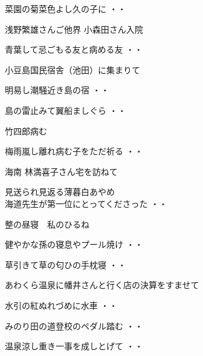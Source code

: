 \begin{shiika}菜園の菊菜色よし久の子に
\hfill{・・}\end{shiika}
\vspace{0.6cm}
浅野繁雄さんご他界 小森田さん入院
\begin{shiika}青葉して忌ごもる友と病める友
\hfill{・・}\end{shiika}
\vspace{0.6cm}
小豆島国民宿舎（池田）に集まりて
\begin{shiika}明易し潮騒近き島の宿
\hfill{・・}\end{shiika}
\vspace{0.6cm}
\begin{shiika}島の雷止みて翼船ましぐら
\hfill{・・}\end{shiika}
\vspace{0.6cm}
竹四郎病む
\begin{shiika}梅雨嵐し離れ病む子をただ祈る
\hfill{・・}\end{shiika}
\vspace{0.6cm}
海南 林満喜子さん宅を訪ねて
\begin{shiika}見送られ見返る薄暮白あやめ\\
海道先生が第一位にとってくださった
\hfill{・・}\end{shiika}
\vspace{0.6cm}
整の昼寝　私のひるね
\begin{shiika}健やかな孫の寝息やプール焼け
\hfill{・・}\end{shiika}
\begin{shiika}草引きて草の匂ひの手枕寝
\hfill{・・}\end{shiika}
\vspace{0.6cm}
あわくら温泉に幡井さんと行く店の決算をすませて
\begin{shiika}水引の紅ぬれづめに水車
\hfill{・・}\end{shiika}
\begin{shiika}みのり田の道登校のペダル踏む
\hfill{・・}\end{shiika}
\begin{shiika}温泉涼し重き一事を成しとげて
\hfill{・・}\end{shiika}
